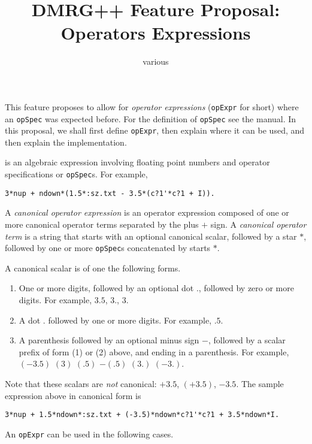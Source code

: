 \documentclass{article}
\begin{document}
\title{DMRG++ Feature Proposal:\\
Operators Expressions}
\author{various}
\maketitle

This feature proposes to allow for \emph{operator expressions} 
(\texttt{opExpr} for short) where an \texttt{opSpec} was expected before.
For the definition of \texttt{opSpec} see the manual.
In this proposal, we shall first define \texttt{opExpr}, then explain
where it can be used, and then explain the implementation.

 is an algebraic expression involving
floating point numbers and operator specifications or \texttt{opSpec}s.
For example, 
\begin{verbatim}
3*nup + ndown*(1.5*:sz.txt - 3.5*(c?1'*c?1 + I)).
\end{verbatim}
A \emph{canonical operator expression} is an operator expression composed of one or
more canonical operator terms separated by the plus $+$ sign.
A \emph{canonical operator term} is a string that starts with an 
optional canonical scalar,
followed by a star $*$, followed by one or more \texttt{opSpec}s concatenated
by starts $*$.

A canonical scalar is of one the following 
forms.
\begin{enumerate}
\item One or more digits, followed by an optional dot $.$, followed by zero or
more digits. For example, $3.5$, $3.$, $3$.
\item A dot $.$ followed by one or more digits. For example, $.5$.
\item A parenthesis followed by an optional minus sign $-$, 
followed by a scalar prefix of form (1) or (2) above, and ending in a
parenthesis.
For example, $(-3.5)$ $(3)$ $(.5)$ $-(.5)$ $(3.)$ $(-3.)$.
\end{enumerate}
Note that these scalars are \emph{not} canonical: $+3.5$, $(+3.5)$, $-3.5$.
The sample expression above in canonical form is
\begin{verbatim}
3*nup + 1.5*ndown*:sz.txt + (-3.5)*ndown*c?1'*c?1 + 3.5*ndown*I.
\end{verbatim}

An \texttt{opExpr} can be used in the following cases.
\end{document}
